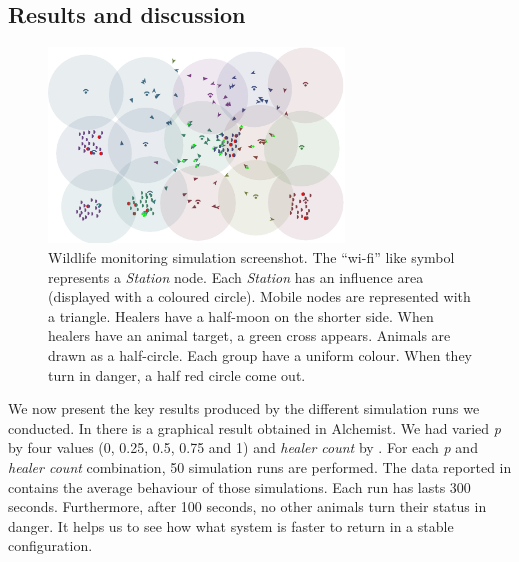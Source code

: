 \subsection{Results and discussion}\label{mdpi2020:sb:results}

\begin{figure}
\centering
\includegraphics[width=0.7\textwidth]{papers/mdpi2020/imgs/alchemist-v2.png}
\caption[Wildlife monitoring simulation screenshot]{Wildlife monitoring simulation screenshot. 
 The ``wi-fi'' like symbol represents a \emph{Station} node. 
 Each \emph{Station} has an influence area (displayed with a coloured circle). 
 Mobile nodes are represented with a triangle.
 Healers have a half-moon on the shorter side. 
 When healers have an animal target, a green cross appears. 
 Animals are drawn as a half-circle. Each group have a uniform colour. 
 When they turn in danger, a half red circle come out.
}
\label{mdpi2020:fig:wildlife-monitoring-gui}
\end{figure}

We now present the key results produced 
 by the different simulation runs we conducted. In  there is
 a graphical result obtained in Alchemist.
%
 We had varied \emph{p} by four values (0, 0.25, 0.5, 0.75 and 1) and \emph{healer count} by . 
 For each \emph{p} and \emph{healer count} combination, 50 simulation runs are performed. 
 The data reported in  contains the average behaviour of those simulations. 
% 
%
Each run has lasts 300 seconds. 
 Furthermore, after 100 seconds, no other animals turn their status in danger.
 It helps us to see how what system is faster to return in a stable configuration.

